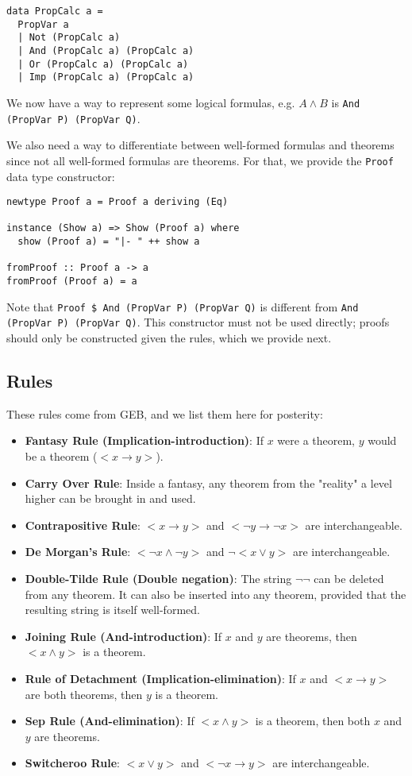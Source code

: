 \documentclass{article}
\begin{document}
\begin{lstlisting}
data PropCalc a =
  PropVar a
  | Not (PropCalc a)
  | And (PropCalc a) (PropCalc a)
  | Or (PropCalc a) (PropCalc a)
  | Imp (PropCalc a) (PropCalc a)
\end{lstlisting}

We now have a way to represent some logical formulas, e.g. $A \land B$ is \texttt{And (PropVar P) (PropVar Q)}.

We also need a way to differentiate between well-formed formulas and theorems since not all well-formed formulas are theorems. For that, we provide the \texttt{Proof} data type constructor:

\begin{lstlisting}
newtype Proof a = Proof a deriving (Eq)

instance (Show a) => Show (Proof a) where
  show (Proof a) = "|- " ++ show a

fromProof :: Proof a -> a
fromProof (Proof a) = a
\end{lstlisting}

Note that \texttt{Proof \$ And (PropVar P) (PropVar Q)} is different from \texttt{And (PropVar P) (PropVar Q)}. This constructor must not be used directly; proofs should only be constructed given the rules, which we provide next.

\subsection{Rules}

These rules come from GEB, and we list them here for posterity:

\begin{itemize}
\item \textbf{Fantasy Rule (Implication-introduction)}: If $x$ were a theorem, $y$ would be a theorem ($<x \to y>$).
\item \textbf{Carry Over Rule}: Inside a fantasy, any theorem from the "reality" a level higher can be brought in and used.
\item \textbf{Contrapositive Rule}: $< x \to y>$ and $< \neg y \to \neg x>$ are interchangeable.
\item \textbf{De Morgan's Rule}: $< \neg x \land \neg y>$ and $\neg<x \lor y>$ are interchangeable.
\item \textbf{Double-Tilde Rule (Double negation)}: The string $\neg\neg$ can be deleted from any theorem. It can also be inserted into any theorem, provided that the resulting string is itself well-formed.
\item \textbf{Joining Rule (And-introduction)}: If $x$ and $y$ are theorems, then $<x \land y>$ is a theorem.
\item \textbf{Rule of Detachment (Implication-elimination)}: If $x$ and $<x \to y>$ are both theorems, then $y$ is a theorem.
\item \textbf{Sep Rule (And-elimination)}: If $<x \land y>$ is a theorem, then both $x$ and $y$ are theorems.
\item \textbf{Switcheroo Rule}: $<x \lor y>$ and $<\neg x \to y>$ are interchangeable.
\end{itemize}
\end{document}
